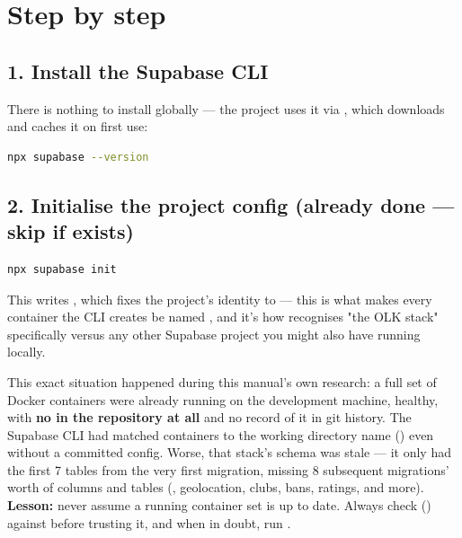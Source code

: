 \section{Step by step}

\subsection{1. Install the Supabase CLI}

There is nothing to install globally — the project uses it via , which downloads and caches it on first use:

\begin{lstlisting}[style=olkcodebash, language=bash, caption={Confirming the CLI is reachable}]
npx supabase --version
\end{lstlisting}

\subsection{2. Initialise the project config (already done — skip if  exists)}

\begin{lstlisting}[style=olkcodebash, language=bash, caption={One-time: generates supabase/config.toml}]
npx supabase init
\end{lstlisting}

This writes , which fixes the project's identity to  — this is what makes every container the CLI creates be named , and it's how  recognises "the OLK stack" specifically versus any other Supabase project you might also have running locally.

\begin{olkgotcha}
This exact situation happened during this manual's own research: a full set of  Docker containers were already running on the development machine, healthy, with \textbf{no  in the repository at all} and no record of it in git history. The Supabase CLI had matched containers to the working directory name () even without a committed config. Worse, that stack's schema was stale — it only had the first 7 tables from the very first migration, missing 8 subsequent migrations' worth of columns and tables (, geolocation, clubs, bans, ratings, and more). \textbf{Lesson:} never assume a running  container set is up to date. Always check () against  before trusting it, and when in doubt, run .
\end{olkgotcha}

